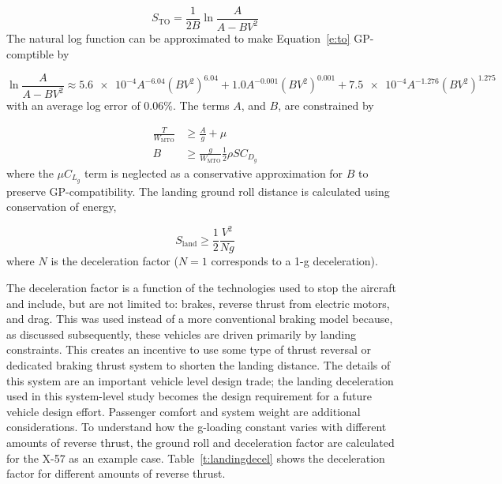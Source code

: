 \documentclass[]{aiaa-tc}%
\begin{document}
\begin{equation}
    \label{e:to}
    S_{\mathrm{TO}} = \frac{1}{2B} \ln{\frac{A}{A-BV^2}} 
\end{equation}
The natural log function can be approximated to make Equation~\ref{e:to} GP-comptible by 

\begin{equation}
    \ln{\frac{A}{A-BV^2}} \approx \num{5.6e-4} A^{-6.04} (BV^2)^{6.04} + 1.0 A^{-0.001} (BV^2)^{0.001} + \num{7.5e-4} A^{-1.276} (BV^2)^{1.275}
\end{equation}
with an average log error of 0.06\%.  The terms $A$, and $B$, are constrained by

\begin{align}
    \frac{T}{W_{\mathrm{MTO}}} &\geq \frac{A}{g} + \mu \\
    B &\geq \frac{g}{W_{\mathrm{MTO}}} \frac{1}{2} \rho S C_{D_g}
\end{align}
where the $\mu C_{L_g}$ term is neglected as a conservative approximation for $B$ to preserve GP-compatibility. The landing ground roll distance is calculated using conservation of energy, 

\begin{equation}
    \label{e:sgr}
    S_{\mathrm{land}} \geq \frac{1}{2} \frac{V^2}{Ng} 
\end{equation}
where $N$ is the deceleration factor ($N=1$ corresponds to a 1-g deceleration). 

The deceleration factor is a function of the technologies used to stop the aircraft and include, but are not limited to: brakes, reverse thrust from electric motors, and drag.  This was used instead of a more conventional braking model because, as discussed subsequently, these vehicles are driven primarily by landing constraints.  This creates an incentive to use some type of thrust reversal or dedicated braking thrust system to shorten the landing distance.  The details of this system are an important vehicle level design trade; the landing deceleration used in this system-level study becomes the design requirement for a future vehicle design effort. Passenger comfort and system weight are additional considerations.  
To understand how the g-loading constant varies with different amounts of reverse thrust, the ground roll and deceleration factor are calculated for the X-57 as an example case. 
Table~\ref{t:landingdecel} shows the deceleration factor for different amounts of reverse thrust. 
\end{document}
